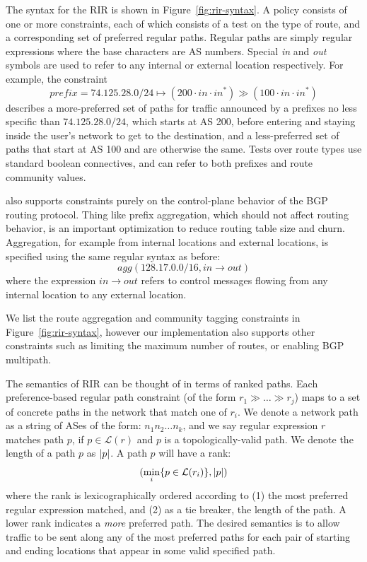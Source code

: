 
The syntax for the RIR is shown in Figure~\ref{fig:rir-syntax}. A policy consists of one or more constraints, each of which consists of a test on the type of route, and a corresponding set of preferred regular paths. Regular paths are simply regular expressions where the base characters are AS numbers. Special \textit{in} and \textit{out} symbols are used to refer to any internal or external location respectively.
For example, the constraint 
$$prefix=74.125.28.0/24 \mapsto (200 \cdot in \cdot in^*) \gg (100 \cdot in \cdot in^*)$$
describes a more-preferred set of paths for traffic announced by a prefixes no less specific than $74.125.28.0/24$, which starts at AS 200, before entering and staying inside the user's network to get to the destination, and a less-preferred set of paths that start at AS 100 and are otherwise the same. Tests over route types use standard boolean connectives, and can refer to both prefixes and route community values.

\sysname also supports constraints purely on the control-plane behavior of the BGP routing protocol. Thing like prefix aggregation, which should not affect routing behavior, is an important optimization to reduce routing table size and churn. Aggregation, for example from internal locations and external locations, is specified using the same regular syntax as before: 
$$agg(128.17.0.0/16, in \rightarrow out)$$
where the expression $in \rightarrow out$ refers to control messages flowing from any internal location to any external location.

We list the route aggregation and community tagging constraints in Figure~\ref{fig:rir-syntax}, however our implementation also supports other constraints such as limiting the maximum number of routes, or enabling BGP multipath.



The semantics of RIR can be thought of in terms of ranked paths. Each preference-based regular path constraint (of the form $r_1 \gg \dots \gg r_j$) maps to a set of concrete paths in the network that match one of $r_i$. We denote a network path as a string of ASes of the form: $n_1 n_2 \dots n_k$, and we say regular expression $r$ matches path $p$, if $p \in \mathcal{L}(r)$ and $p$ is a topologically-valid path. We denote the length of a path $p$ as $ \lvert p \rvert $. A path $p$ will have a rank: 
$$(\min_i \{  p \in \mathcal{L}(r_i)  \} ,  \lvert p \rvert )$$
where the rank is lexicographically ordered according to (1) the most preferred regular expression matched, and (2) as a tie breaker, the length of the path. A lower rank indicates a \emph{more} preferred path. The desired semantics is to allow traffic to be sent along any of the most preferred paths for each pair of starting and ending locations that appear in some valid specified path. 

